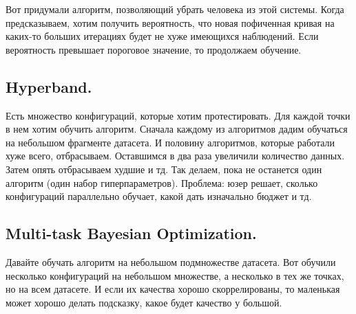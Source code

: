 Вот придумали алгоритм, позволяющий убрать человека из этой системы. Когда предсказываем, хотим получить вероятность, что новая пофиченная кривая на каких-то больших итерациях будет не хуже имеющихся наблюдений. Если вероятность превышает пороговое значение, то продолжаем обучение. 
    
\subsection{Hyperband.}
Есть множество конфигураций, которые хотим протестировать. Для каждой точки в нем хотим обучить алгоритм. Сначала каждому из алгоритмов дадим обучаться на небольшом фрагменте датасета. И половину алгоритмов, которые работали хуже всего, отбрасываем. Оставшимся в два раза увеличили количество данных. Затем опять отбрасываем худшие и тд. Так делаем, пока не останется один алгоритм (один набор гиперпараметров). Проблема: юзер решает, сколько конфигураций параллельно обучает, какой дать изначально бюджет и тд.
    
\subsection{Multi-task Bayesian Optimization.}
Давайте обучать алгоритм на небольшом подмножестве датасета. Вот обучили несколько конфигураций на небольшом множестве, а несколько в тех же точках, но на всем датасете. И если их качества хорошо скоррелированы, то маленькая может хорошо делать подсказку, какое будет качество у большой. 
